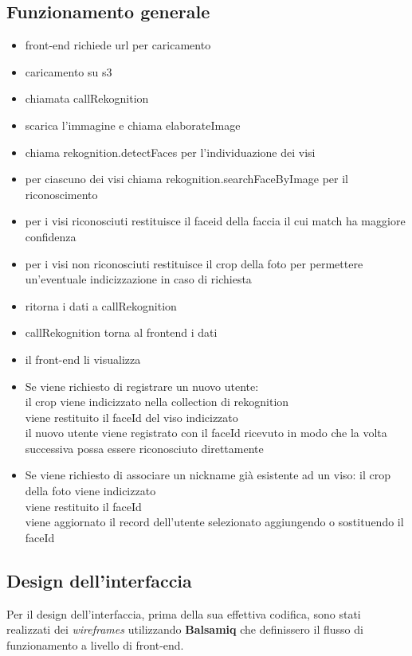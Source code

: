 	
	
	\subsection{Funzionamento generale}
	\begin{itemize}
		\item front-end richiede url per caricamento
		\item caricamento su s3
		\item chiamata callRekognition
		\item scarica l'immagine e chiama elaborateImage
		\item chiama rekognition.detectFaces per l'individuazione dei visi
		\item per ciascuno dei visi chiama rekognition.searchFaceByImage per il riconoscimento 
		\item per i visi riconosciuti restituisce il faceid della faccia il cui match ha maggiore confidenza
		\item per i visi non riconosciuti restituisce il crop della foto per permettere un'eventuale indicizzazione in caso di richiesta
		\item ritorna i dati a callRekognition
		\item callRekognition torna al frontend i dati 
		\item il front-end li visualizza
		
		\item Se viene richiesto di registrare un nuovo utente:\\
		il crop viene indicizzato nella collection di rekognition\\
		viene restituito il faceId del viso indicizzato \\
		il nuovo utente viene registrato con il faceId ricevuto in modo che la volta successiva possa essere riconosciuto direttamente
		
		\item Se viene richiesto di associare un nickname già esistente ad un viso:
		il crop della foto viene indicizzato\\
		viene restituito il faceId\\
		viene aggiornato il record dell'utente selezionato aggiungendo o sostituendo il faceId
	\end{itemize}
	
		
		
	
	
	\subsection{Design dell'interfaccia}
	Per il design dell'interfaccia, prima della sua effettiva codifica, sono stati realizzati dei \emph{wireframes} utilizzando \textbf{Balsamiq} che definissero il flusso di funzionamento a livello di front-end. \\ 

